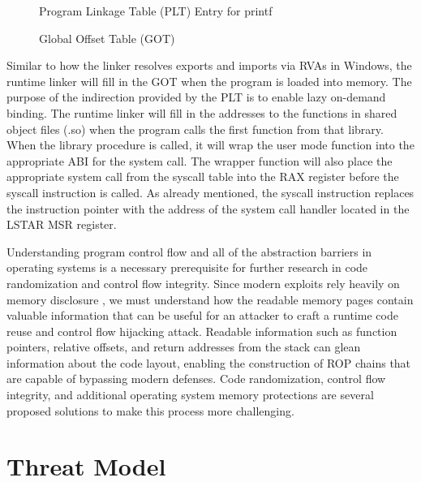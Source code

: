 \documentclass[preprint,12pt]{elsarticle}
\begin{document}
\begin{figure}[ht]
\centering{}
\caption{Program Linkage Table (PLT) Entry for printf}
\label{fig:plt}
\end{figure}

\begin{figure}[ht]
\centering{}
\caption{Global Offset Table (GOT)}
\label{fig:got}
\end{figure}

Similar to how the linker resolves exports and imports via RVAs in Windows, the runtime linker will fill in the GOT when the program is loaded into memory. The purpose of the indirection provided by the PLT is to enable lazy on-demand binding. The runtime linker will fill in the addresses to the functions in shared object files (.so) when the program calls the first function from that library. When the library procedure is called, it will wrap the user mode function into the appropriate ABI for the system call. The wrapper function will also place the appropriate system call from the syscall table into the RAX register before the syscall instruction is called. As already mentioned, the syscall instruction replaces the instruction pointer with the address of the system call handler located in the LSTAR MSR register.

Understanding program control flow and all of the abstraction barriers in operating systems is a necessary prerequisite for further research in code randomization and control flow integrity. Since modern exploits rely heavily on memory disclosure \cite{szekeres2013sok}, we must understand how the readable memory pages contain valuable information that can be useful for an attacker to craft a runtime code reuse and control flow hijacking attack. Readable information such as function pointers, relative offsets, and return addresses from the stack can glean information about the code layout, enabling the construction of ROP chains that are capable of bypassing modern defenses. Code randomization, control flow integrity, and additional operating system memory protections are several proposed solutions to make this process more challenging.

\section{Threat Model}
\label{S:3}
\end{document}
